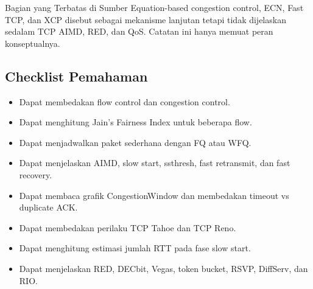 \begin{cmt}{Bagian yang Terbatas di Sumber}{}
Equation-based congestion control, ECN, Fast TCP, dan XCP disebut sebagai mekanisme lanjutan tetapi tidak dijelaskan sedalam TCP AIMD, RED, dan QoS. Catatan ini hanya memuat peran konseptualnya.
\end{cmt}

\subsection{Checklist Pemahaman}

\begin{itemize}
    \item Dapat membedakan flow control dan congestion control.
    \item Dapat menghitung Jain's Fairness Index untuk beberapa flow.
    \item Dapat menjadwalkan paket sederhana dengan FQ atau WFQ.
    \item Dapat menjelaskan AIMD, slow start, ssthresh, fast retransmit, dan fast recovery.
    \item Dapat membaca grafik CongestionWindow dan membedakan timeout vs duplicate ACK.
    \item Dapat membedakan perilaku TCP Tahoe dan TCP Reno.
    \item Dapat menghitung estimasi jumlah RTT pada fase slow start.
    \item Dapat menjelaskan RED, DECbit, Vegas, token bucket, RSVP, DiffServ, dan RIO.
\end{itemize}

